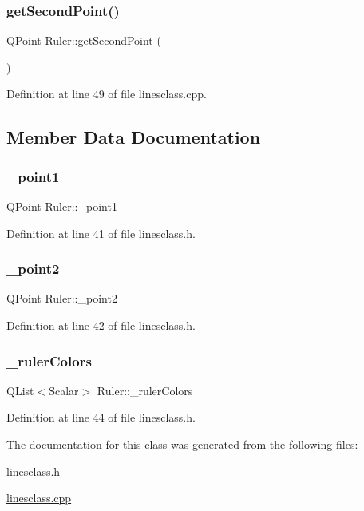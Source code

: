 \subsubsection{\texorpdfstring{getSecondPoint()}{getSecondPoint()}}
{\footnotesize\ttfamily Q\+Point Ruler\+::get\+Second\+Point (\begin{DoxyParamCaption}{ }\end{DoxyParamCaption})}



Definition at line 49 of file linesclass.\+cpp.



\subsection{Member Data Documentation}
\mbox{\label{classRuler_ae0b82ebbe2c601703de75c6aed392ed3}} 
\subsubsection{\texorpdfstring{\_point1}{\_point1}}
{\footnotesize\ttfamily Q\+Point Ruler\+::\+\_\+point1\hspace{0.3cm}{\ttfamily [private]}}



Definition at line 41 of file linesclass.\+h.

\mbox{\label{classRuler_aa33c51b7768f1852bea7389502079048}} 
\subsubsection{\texorpdfstring{\_point2}{\_point2}}
{\footnotesize\ttfamily Q\+Point Ruler\+::\+\_\+point2\hspace{0.3cm}{\ttfamily [private]}}



Definition at line 42 of file linesclass.\+h.

\mbox{\label{classRuler_afa7fe69c326cc41b1ae71a8c69e41559}} 
\subsubsection{\texorpdfstring{\_rulerColors}{\_rulerColors}}
{\footnotesize\ttfamily Q\+List$<$Scalar$>$ Ruler\+::\+\_\+ruler\+Colors\hspace{0.3cm}{\ttfamily [private]}}



Definition at line 44 of file linesclass.\+h.



The documentation for this class was generated from the following files\+:\begin{DoxyCompactItemize}
\item 
\mbox{\hyperlink{linesclass_8h}{linesclass.\+h}}\item 
\mbox{\hyperlink{linesclass_8cpp}{linesclass.\+cpp}}\end{DoxyCompactItemize}
